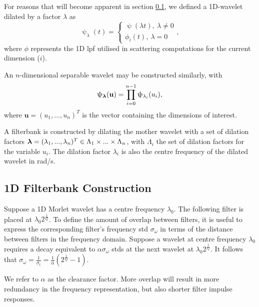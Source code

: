 For reasons that will become apparent in section \ref{sec:filterbank}, we defined a 1D-wavelet dilated by a factor $\lambda$ as 
\begin{equation}
\label{eqn:dilwav}
    \uppsi_\lambda(t) = \begin{cases}
        \uppsi(\lambda t), \ \lambda \neq 0 \\
        \phi_i(t), \ \lambda = 0
    \end{cases},
\end{equation}
where $\phi$ represents the 1D \ac{lpf} utilised in scattering computations for the current dimension ($i$).

An $n$-dimensional separable wavelet may be constructed similarly, with
\begin{equation}
    \uppsi_{\boldsymbol{\mathbf{\lambda}} }(\mathbf{u}) = \prod_{i=0}^{n-1} \uppsi_{\lambda_i}(u_i),
\end{equation}
where $\mathbf{u} = \left(u_1, ..., u_n\right)^T$ is the vector containing the dimensions of interest.

A filterbank is constructed by dilating the mother wavelet with a set of dilation factors $\boldsymbol{\mathbf{\lambda}} =(\lambda_1, ..., \lambda_n )^T \in \Lambda_1 \times ... \times \Lambda_n$, with $\Lambda_i$ the set of dilation factors for the variable $u_i$. The dilation factor $\lambda_i$ is also the centre frequency of the dilated wavelet in rad/s. 



\subsection{1D Filterbank Construction}
\label{sec:filterbank}
 Suppose a 1D Morlet wavelet has a centre frequency $\lambda_0$. The following filter is placed at $\lambda_0 2^{\frac{1}{Q}}$. To define the amount of overlap between filters, it is useful to express the corresponding filter's frequency \ac{std} $\sigma_\omega$ in terms of the distance between filters in the frequency domain. Suppose a wavelet at centre frequency $\lambda_0$ requires a decay equivalent to $\alpha \sigma_\omega$ \ac{std}s at the next wavelet at $\lambda_0 2^{\frac{1}{Q}}$. It follows that $\sigma_\omega = \frac{1}{\sigma_t} = \frac{1}{\alpha}\left( 2^\frac{1}{Q} - 1 \right)$.

We refer to $\alpha$ as the clearance factor. More overlap will result in more redundancy in the frequency representation, but also shorter filter impulse responses. 

